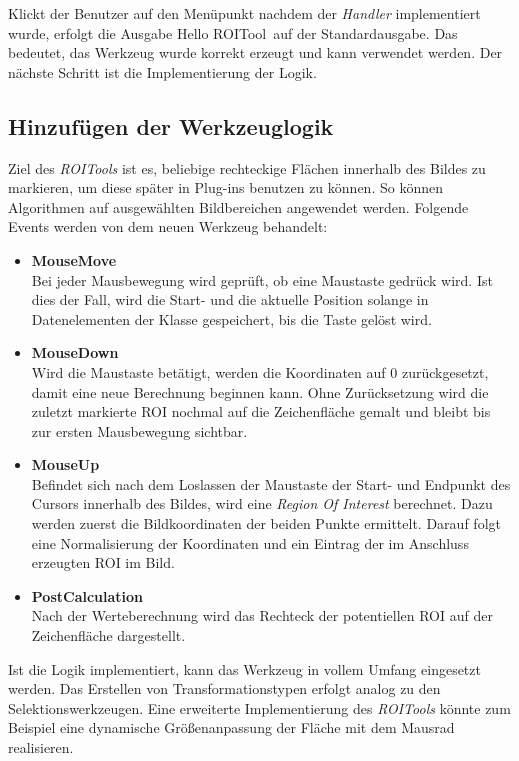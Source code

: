 Klickt der Benutzer auf den Menüpunkt nachdem der \textit{Handler} implementiert wurde, erfolgt die Ausgabe \glqq Hello ROITool\grqq\ auf der Standardausgabe. Das bedeutet, das Werkzeug wurde korrekt erzeugt und kann verwendet werden. Der nächste Schritt ist die Implementierung der Logik.

\subsection{Hinzufügen der Werkzeuglogik}

Ziel des \textit{ROITools} ist es, beliebige rechteckige Flächen innerhalb des Bildes zu markieren, um diese später in Plug-ins benutzen zu können. So können Algorithmen auf ausgewählten Bildbereichen angewendet werden. Folgende Events werden von dem neuen Werkzeug behandelt:

\begin{itemize}
\item \textbf{MouseMove} \\
Bei jeder Mausbewegung wird geprüft, ob eine Maustaste gedrück wird. Ist dies der Fall, wird die Start- und die aktuelle Position solange in Datenelementen der Klasse gespeichert, bis die Taste gelöst wird.
\item \textbf{MouseDown} \\
Wird die Maustaste betätigt, werden die Koordinaten auf $0$ zurückgesetzt, damit eine neue Berechnung beginnen kann. Ohne Zurücksetzung wird die zuletzt markierte ROI nochmal auf die Zeichenfläche gemalt und bleibt bis zur ersten Mausbewegung sichtbar.
\item \textbf{MouseUp} \\
 Befindet sich nach dem Loslassen der Maustaste der Start- und Endpunkt des Cursors innerhalb des Bildes, wird eine \textit{Region Of Interest} berechnet. Dazu werden zuerst die Bildkoordinaten der beiden Punkte ermittelt. Darauf folgt eine Normalisierung der Koordinaten und ein Eintrag der im Anschluss erzeugten ROI im Bild.
\item \textbf{PostCalculation} \\
Nach der Werteberechnung wird das Rechteck der potentiellen ROI auf der Zeichenfläche dargestellt.
\end{itemize}


Ist die Logik implementiert, kann das Werkzeug in vollem Umfang eingesetzt werden. Das Erstellen von Transformationstypen erfolgt analog zu den Selektionswerkzeugen. Eine erweiterte Implementierung des \textit{ROITools} könnte zum Beispiel eine dynamische Größenanpassung der Fläche mit dem Mausrad realisieren.
